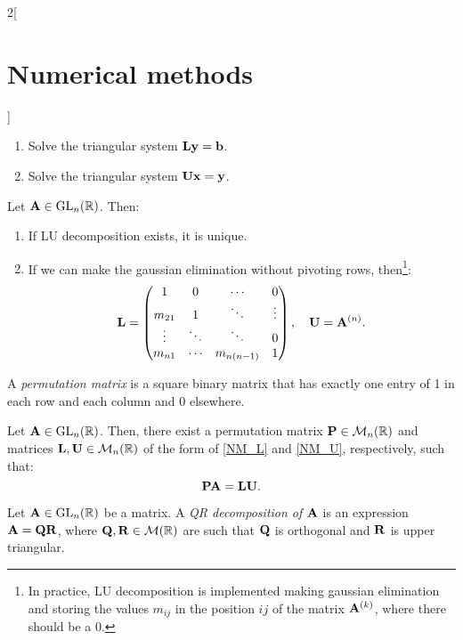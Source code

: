 \documentclass[../../../main.tex]{subfiles}
\begin{document}
\begin{multicols}{2}[\section{Numerical methods}]
\begin{lemma}
    \begin{enumerate}
        \item Solve the triangular system $\vb{L}\vb{y}=\vb{b}$.
        \item Solve the triangular system $\vb{U}\vb{x}=\vb{y}$.
    \end{enumerate}
\end{lemma}
\begin{prop}
    Let $\vb{A}\in\mathrm{GL}_n(\mathbb{R})$. Then:
    \begin{enumerate}
        \item If LU decomposition exists, it is unique.
        \item If we can make the gaussian elimination without pivoting rows, then\footnote{In practice, LU decomposition is implemented making gaussian elimination and storing the values $m_{ij}$ in the position $ij$ of the matrix $\vb{A}^{(k)}$, where there should be a 0.}:
        $$
        \vb{L}=
        \begin{pmatrix}
            1 & 0 & \cdots & 0\\
            m_{21} & 1 & \ddots & \vdots \\
            \vdots & \ddots & \ddots & 0\\
            m_{n1} & \cdots & m_{n(n-1)} & 1
        \end{pmatrix},\quad
        \vb{U}=\vb{A}^{(n)}.
        $$
    \end{enumerate}
\end{prop}
\begin{definition}
    A \textit{permutation matrix} is a square binary matrix that has exactly one entry of 1 in each row and each column and 0 elsewhere. 
\end{definition}
\begin{prop}
    Let $\vb{A}\in\mathrm{GL}_n(\mathbb{R})$. Then, there exist a permutation matrix $\vb{P}\in\mathcal{M}_n(\mathbb{R})$ and matrices $\vb{L},\vb{U}\in\mathcal{M}_n(\mathbb{R})$ of the form of \eqref{NM_L} and \eqref{NM_U}, respectively, such that: $$\vb{P}\vb{A}=\vb{L}\vb{U}.$$
\end{prop}
\begin{definition}[QR descompostion]
    Let $\vb{A}\in\mathrm{GL}_n(\mathbb{R})$ be a matrix. A \textit{QR decomposition of $\vb{A}$} is an expression $\vb{A}=\vb{Q}\vb{R}$, where $\vb{Q},\vb{R}\in\mathcal{M}(\mathbb{R})$ are such that $\vb{Q}$ is orthogonal and $\vb{R}$ is upper triangular.

\end{definition}
\end{multicols}
\end{document}
